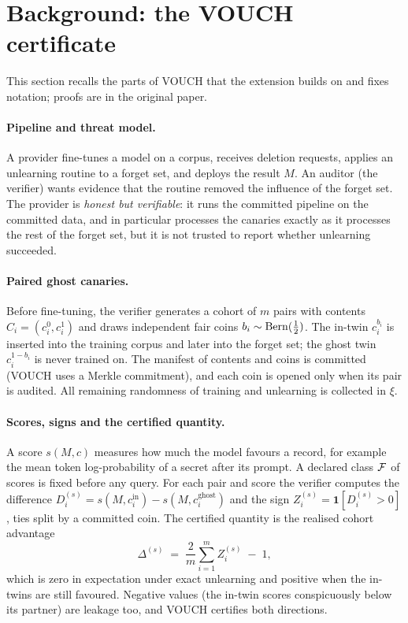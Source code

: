 \section{Background: the VOUCH certificate}\label{sec:background}

This section recalls the parts of VOUCH \citep{dang2026vouch} that the extension builds
on and fixes notation; proofs are in the original paper.

\paragraph{Pipeline and threat model.} A provider fine-tunes a model on a corpus,
receives deletion requests, applies an unlearning routine to a forget set, and deploys
the result $M$. An auditor (the verifier) wants evidence that the routine removed the
influence of the forget set. The provider is \emph{honest but verifiable}: it runs the
committed pipeline on the committed data, and in particular processes the canaries
exactly as it processes the rest of the forget set, but it is not trusted to report
whether unlearning succeeded.

\paragraph{Paired ghost canaries.} Before fine-tuning, the verifier generates a cohort of
$m$ pairs with contents $C_i=(c_i^0,c_i^1)$ and draws independent fair coins
$b_i\sim\mathrm{Bern}(\frac12)$. The in-twin $c_i^{b_i}$ is inserted into the training corpus
and later into the forget set; the ghost twin $c_i^{1-b_i}$ is never trained on. The
manifest of contents and coins is committed (VOUCH uses a Merkle commitment), and each
coin is opened only when its pair is audited. All remaining randomness of training and
unlearning is collected in $\xi$.

\paragraph{Scores, signs and the certified quantity.} A score $s(M,c)$ measures how much
the model favours a record, for example the mean token log-probability of a secret
after its prompt. A declared class $\mathcal{F}$ of scores is fixed before any query. For each
pair and score the verifier computes the difference
$D_i^{(s)}=s(M,c_i^{\mathrm{in}})-s(M,c_i^{\mathrm{ghost}})$ and the sign
$Z_i^{(s)}=\mathbf 1[D_i^{(s)}>0]$, ties split by a committed coin. The certified
quantity is the realised cohort advantage
\[
\Delta^{(s)} \;=\; \frac{2}{m}\sum_{i=1}^m Z_i^{(s)} \;-\; 1 ,
\]
which is zero in expectation under exact unlearning and positive when the in-twins are
still favoured. Negative values (the in-twin scores conspicuously below its partner)
are leakage too, and VOUCH certifies both directions.

